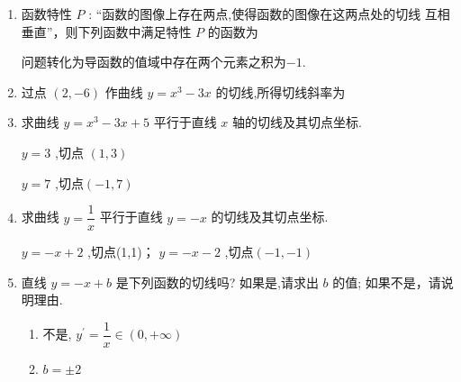 \begin{enumerate}
\begin{jieda}
        直线 $y =  - x - 1$ 与 $x$ 轴交于点(-1,0),与 $y$ 轴交于点$(0, -1)$，因此所求三角形的面积为 $\dfrac{1}{2} \times  1 \times  1 = \dfrac{1}{2}$ 
    \end{jieda} 

    \item 函数特性 $P$ : “函数的图像上存在两点,使得函数的图像在这两点处的切线 互相垂直”，则下列函数中满足特性 $P$ 的函数为
    \begin{jieda}
        问题转化为导函数的值域中存在两个元素之积为$-1$.
    \end{jieda}
    
    \item 过点 $\left( {2, - 6}\right)$ 作曲线 $y = {x}^{3} - {3x}$ 的切线,所得切线斜率为
    
    \item 求曲线 $y = {x}^{3} - {3x} + 5$ 平行于直线 $x$ 轴的切线及其切点坐标.
    \begin{jieda}
        $y = 3$ ,切点 $\left( {1,3}\right)$
        
        $y = 7$ ,切点$(-1,7)$
    \end{jieda}
    
    \item 求曲线 $y = \dfrac{1}{x}$ 平行于直线 $y =  - x$ 的切线及其切点坐标.
    \begin{jieda}
        $y =  - x + 2$ ,切点(1,1)； $y =  - x - 2$ ,切点$(-1, -1)$
    \end{jieda}
    
    \item 直线 $y =  - x + b$ 是下列函数的切线吗? 如果是,请求出 ${b}$ 的值; 如果不是，请说明理由.  
    \begin{jieda}
        \begin{enumerate}
            \item 不是, ${y}^{\prime } = \dfrac{1}{x} \in  \left( {0, + \infty }\right)$
            \item $b =  \pm  2$
        \end{enumerate}
    \end{jieda}
    

\end{enumerate}
